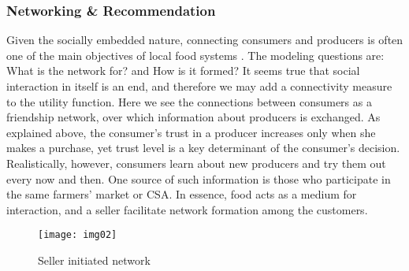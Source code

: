 \documentclass[11pt, oneside]{article}
\begin{document}
\subsubsection{Networking \& Recommendation}
Given the socially embedded nature, connecting consumers and producers is often one of the main objectives of local food systems \parencite{Martinez2010}. The modeling questions are: What is the network for? and How is it formed? It seems true that social interaction in itself is an end, and therefore we may add a connectivity measure to the utility function. Here we see the connections between consumers as a friendship network, over which information about producers is exchanged. As explained above, the consumer's trust in a producer increases only when she makes a purchase, yet trust level is a key determinant of the consumer's decision. Realistically, however, consumers learn about new producers and try them out every now and then. One source of such information is those who participate in the same farmers' market or CSA. In essence, food acts as a medium for interaction, and a seller facilitate network formation among the customers.
\begin{figure}[h]
\centering
  \texttt{[image: img02]}
  \caption{Seller initiated network}
\end{figure}
\end{document}
